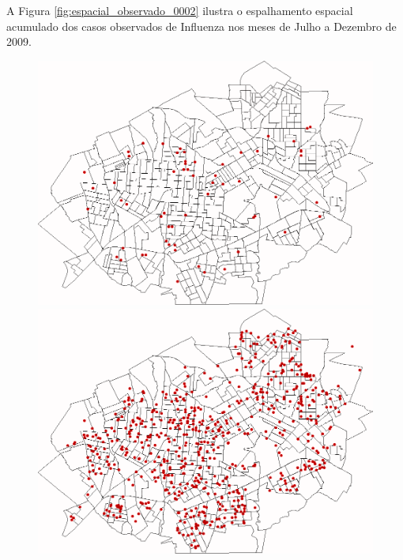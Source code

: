 A Figura \ref{fig:espacial_observado_0002} ilustra o espalhamento espacial acumulado dos casos observados de Influenza nos meses de Julho a Dezembro de 2009.

\begin{figure}[H]
  \centering
  \begin{minipage}{.45\textwidth}
    \centering
    \includegraphics[width=1.0\textwidth]{Figuras/Resultados/Observado/01-07-2009.png}
    \captionsetup{labelformat=empty}
  \end{minipage}%
  \begin{minipage}{.45\textwidth}
    \centering
    \includegraphics[width=1.0\textwidth]{Figuras/Resultados/Observado/01-08-2009.png}
    \captionsetup{labelformat=empty}

\end{minipage}
\end{figure}
